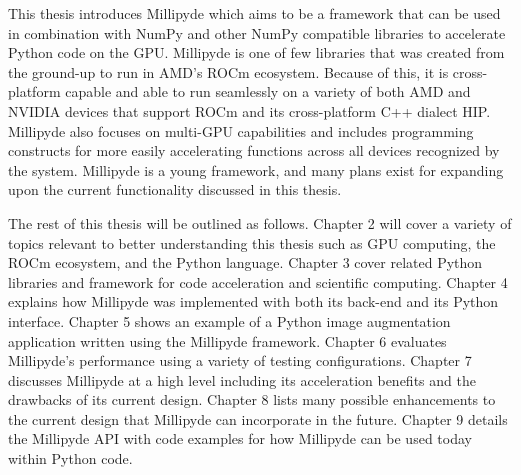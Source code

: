 \quad This thesis introduces Millipyde which aims to be a framework that can be used in combination with NumPy and other NumPy compatible libraries to accelerate Python code on the GPU. Millipyde is one of few libraries that was created from the ground-up to run in AMD's ROCm ecosystem. Because of this, it is cross-platform capable and able to run seamlessly on a variety of both AMD and NVIDIA devices that support ROCm and its cross-platform C++ dialect HIP. Millipyde also focuses on multi-GPU capabilities and includes programming constructs for more easily accelerating functions across all devices recognized by the system. Millipyde is a young framework, and many plans exist for expanding upon the current functionality discussed in this thesis.

\quad The rest of this thesis will be outlined as follows. Chapter 2 will cover a variety of topics relevant to better understanding this thesis such as GPU computing, the ROCm ecosystem, and the Python language. Chapter 3 cover related Python libraries and framework for code acceleration and scientific computing. Chapter 4 explains how Millipyde was implemented with both its back-end and its Python interface. Chapter 5 shows an example of a Python image augmentation application written using the Millipyde framework. Chapter 6 evaluates Millipyde's performance using a variety of testing configurations. Chapter 7 discusses Millipyde at a high level including its acceleration benefits and the drawbacks of its current design. Chapter 8 lists many possible enhancements to the current design that Millipyde can incorporate in the future. Chapter 9 details the Millipyde API with code examples for how Millipyde can be used today within Python code. 